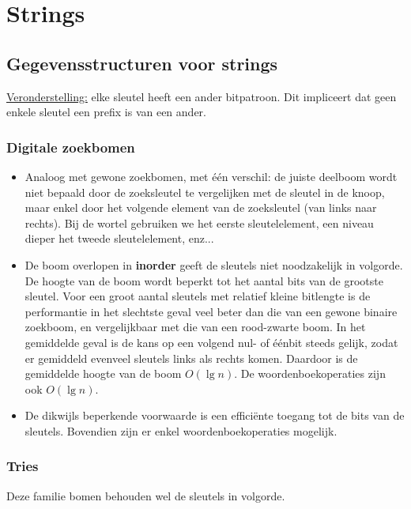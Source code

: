 \documentclass{report}
\begin{document}
\begin{itemize}
\end{itemize}


\part{Strings}

\chapter{Gegevensstructuren voor strings}
\info{} \underline{Veronderstelling:} elke sleutel heeft een ander bitpatroon. Dit impliceert dat geen enkele sleutel een prefix is van een ander.
\section{Digitale zoekbomen}
\begin{itemize}
	\item[\info] Analoog met gewone zoekbomen, met één verschil: de juiste deelboom wordt niet bepaald door de zoeksleutel te vergelijken met de sleutel in de knoop, maar enkel door het volgende element van de zoeksleutel (van links naar rechts). Bij de wortel gebruiken we het eerste sleutelelement, een niveau dieper het tweede sleutelelement, enz...
	\item[\info] De boom overlopen in \textbf{inorder} geeft de sleutels niet noodzakelijk in volgorde. De hoogte van de boom wordt beperkt tot het aantal bits van de grootste sleutel. Voor een groot aantal sleutels met relatief kleine bitlengte is de performantie in het slechtste geval veel beter dan die van een gewone binaire zoekboom, en vergelijkbaar met die van een rood-zwarte boom. In het gemiddelde geval is de kans op een volgend nul- of éénbit steeds gelijk, zodat er gemiddeld evenveel sleutels links als rechts komen. Daardoor is de gemiddelde hoogte van de boom $O(\lg n)$. De woordenboekoperaties zijn ook $O(\lg n)$.
	\item[\alert] De dikwijls beperkende voorwaarde is een efficiënte toegang tot de bits van de sleutels. Bovendien zijn er enkel woordenboekoperaties mogelijk.
\end{itemize}




\section{Tries}
Deze familie bomen behouden wel de sleutels in volgorde.
\end{document}
